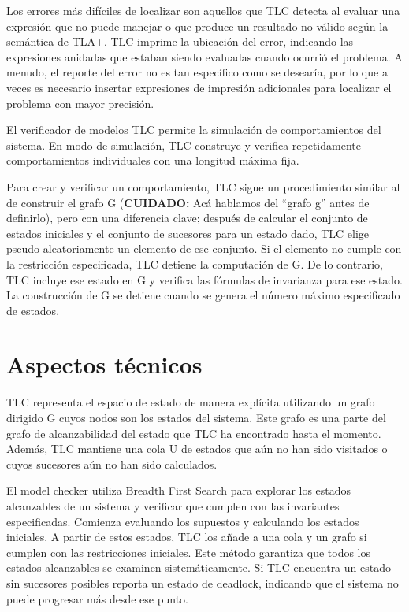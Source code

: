 \documentclass[runningheads]{llncs}
\begin{document}
Los errores más difíciles de localizar son aquellos que TLC detecta al evaluar una expresión que no puede manejar o que produce un resultado no válido según la semántica de TLA+. TLC imprime la ubicación del error, indicando las expresiones anidadas que estaban siendo evaluadas cuando ocurrió el problema. A menudo, el reporte del error no es tan específico como se desearía, por lo que a veces es necesario insertar expresiones de impresión adicionales para localizar el problema con mayor precisión.

El verificador de modelos TLC permite la simulación de comportamientos del sistema. En modo de simulación, TLC construye y verifica repetidamente comportamientos individuales con una longitud máxima fija.

Para crear y verificar un comportamiento, TLC sigue un procedimiento similar al de construir el grafo G (\textbf{CUIDADO:} Acá hablamos del “grafo g” antes de definirlo), pero con una diferencia clave; después de calcular el conjunto de estados iniciales y el conjunto de sucesores para un estado dado, TLC elige pseudo-aleatoriamente un elemento de ese conjunto. Si el elemento no cumple con la restricción especificada, TLC detiene la computación de G. De lo contrario, TLC incluye ese estado en G y verifica las fórmulas de invarianza para ese estado. La construcción de G se detiene cuando se genera el número máximo especificado de estados.

\section{Aspectos técnicos}
TLC representa el espacio de estado de manera explícita utilizando un grafo dirigido G cuyos nodos son los estados del sistema. Este grafo es una parte del grafo de alcanzabilidad del estado que TLC ha encontrado hasta el momento. Además, TLC mantiene una cola U de estados que aún no han sido visitados o cuyos sucesores aún no han sido calculados.

El model checker utiliza Breadth First Search para explorar los estados alcanzables de un sistema y verificar que cumplen con las invariantes especificadas. Comienza evaluando los supuestos y calculando los estados iniciales. A partir de estos estados, TLC los añade a una cola y un grafo si cumplen con las restricciones iniciales. Este método garantiza que todos los estados alcanzables se examinen sistemáticamente. Si TLC encuentra un estado sin sucesores posibles reporta un estado de deadlock, indicando que el sistema no puede progresar más desde ese punto.
\end{document}
